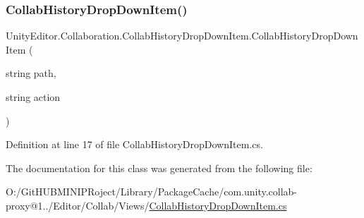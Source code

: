 \subsubsection{\texorpdfstring{CollabHistoryDropDownItem()}{CollabHistoryDropDownItem()}}
{\footnotesize\ttfamily Unity\+Editor.\+Collaboration.\+Collab\+History\+Drop\+Down\+Item.\+Collab\+History\+Drop\+Down\+Item (\begin{DoxyParamCaption}\item[{string}]{path,  }\item[{string}]{action }\end{DoxyParamCaption})}



Definition at line 17 of file Collab\+History\+Drop\+Down\+Item.\+cs.



The documentation for this class was generated from the following file\+:\begin{DoxyCompactItemize}
\item 
O\+:/\+Git\+H\+U\+B\+M\+I\+N\+I\+P\+Roject/\+Library/\+Package\+Cache/com.\+unity.\+collab-\/proxy@1../\+Editor/\+Collab/\+Views/\mbox{\hyperlink{_collab_history_drop_down_item_8cs}{Collab\+History\+Drop\+Down\+Item.\+cs}}\end{DoxyCompactItemize}
